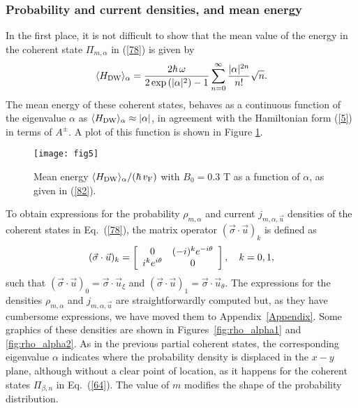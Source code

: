 \documentclass[aps,showpacs,showkeys]{revtex4}
\begin{document}
\subsubsection{Probability and current densities, and mean energy}\label{sec3.2.3}

In the first place, it is not difficult to show that the mean value of the energy in the coherent state $\Pi_{m,\alpha}$ in (\ref{78}) is given by
\begin{equation}\label{82}
	\langle H_{\rm DW}\rangle_\alpha=\frac{2\hbar\,\omega}{2\exp\left(\vert\alpha\vert^2\right)-1}\sum_{n=0}^{\infty}\frac{\vert\alpha\vert^{2n}}{n!}\sqrt{n}.
\end{equation}
The mean energy of these coherent states, behaves as a continuous function of the eigenvalue $\alpha$ as $\langle H_{\rm DW}\rangle_\alpha\approx\vert\alpha\vert$, in agreement with the Hamiltonian form (\ref{5}) in terms of $A^{\pm}$.
A plot of this function is shown in Figure \ref{fig:H_alpha}.

\begin{figure}[htb]
	\centering
	\begin{minipage}[b]{0.34\linewidth}
		\texttt{[image: fig5]}
		\label{fig:H_alpha1}
	\end{minipage}
	\caption{\label{fig:H_alpha}Mean energy $\langle H_{\rm DW}\rangle_{\alpha}/(\hbar\,v_{\rm F})$ with $B_{0}=0.3$ T as a function of $\alpha$, as given in (\ref{82}).}
\end{figure}



To obtain expressions for the probability $\rho_{m,\alpha}$ and current $j_{m,\alpha,\vec{u}}$ densities of the coherent states in Eq.~(\ref{78}), the matrix operator $(\vec{\sigma}\cdot\vec{u})_k$ is defined as
\begin{equation}\label{79}
(\vec{\sigma}\cdot\vec{u})_k=\left[\begin{array}{c c}
0 & (-i)^{k}e^{-i\theta} \\
i^{k}e^{i\theta} & 0
\end{array}\right], \quad k=0,1, 
\end{equation}
such that $(\vec{\sigma}\cdot\vec{u})_0=\vec{\sigma}\cdot\vec{u}_{\xi}$ and $(\vec{\sigma}\cdot\vec{u})_1=\vec{\sigma}\cdot \vec{u}_{\theta}$. The expressions for the densities $\rho_{m,\alpha}$ and $j_{m,\alpha,\vec{u}}$ are straightforwardly computed but, as they have cumbersome expressions, we have moved them to Appendix~\ref{Appendix}. Some graphics of these densities are shown in Figures~\ref{fig:rho_alpha1} and \ref{fig:rho_alpha2}. As in the previous partial coherent states, the corresponding eigenvalue $\alpha$ indicates where the probability density is displaced in the $x-y$ plane, although without a clear point of location, as it happens for the coherent states $\Pi_{\beta,n}$ in Eq.~(\ref{64}). The value of $m$ modifies the shape of the probability distribution. 
\end{document}
